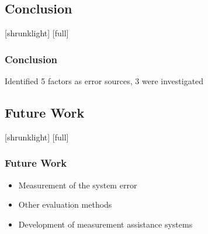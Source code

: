 \documentclass[12pt,compress,aspectratio=169]{beamer} %
\begin{document}
\subsection{Conclusion}
[shrunklight]
[full]
\begin{frame}
	\frametitle{Conclusion}
	Identified 5 factors as error sources, 3 were investigated\\	
	\centering
	\begin{table}
	\begin{center}
	\end{center}
	\end{table}
\end{frame}


\subsection{Future Work}
[shrunklight]
[full]
\begin{frame}[t]
	\frametitle{Future Work}
	\begin{itemize}
		\item Measurement of the system error
		\item Other evaluation methods
		\item Development of measurement assistance systems 
	\end{itemize}
	
	
\end{frame}


\end{document}
